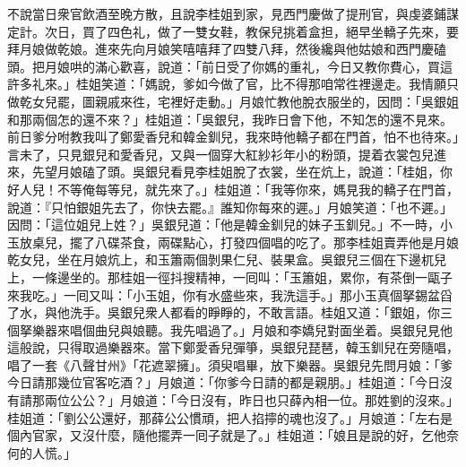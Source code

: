 不說當日衆官飲酒至晚方散，且說李桂姐到家，見西門慶做了提刑官，與虔婆鋪謀定計。次日，買了四色礼，做了一雙女鞋，教保兒挑着盒担，絕早坐轎子先來，要拜月娘做乾娘。進來先向月娘笑嘻嘻拜了四雙八拜，然後纔與他姑娘和西門慶磕頭。{}把月娘哄的滿心歡喜，說道：「前日受了你媽的重礼，今日又教你費心，買這許多礼來。」桂姐笑道：「媽說，爹如今做了官，比不得那咱常徃裡邊走。我情願只做乾女兒罷，圖親戚來徃，宅裡好走動。」月娘忙教他脫衣服坐的，因問：「吳銀姐和那兩個怎的還不來？」桂姐道：「吳銀兒，我昨日會下他，不知怎的還不見來。前日爹分咐教我叫了鄭愛香兒和韓金釧兒，我來時他轎子都在門首，怕不也待來。」言未了，只見銀兒和愛香兒，又與一個穿大紅紗衫年小的粉頭，提着衣裳包兒進來，先望月娘磕了頭。吳銀兒看見李桂姐脫了衣裳，坐在炕上，說道：「桂姐，你好人兒！不等俺每等兒，就先來了。」桂姐道：「我等你來，媽見我的轎子在門首，說道：『只怕銀姐先去了，你快去罷。』誰知你每來的遲。」月娘笑道：「也不遲。」因問：「這位姐兒上姓？」吳銀兒道：「他是韓金釧兒的妹子玉釧兒。」不一時，小玉放桌兒，擺了八碟茶食，兩碟點心，打發四個唱的吃了。那李桂姐賣弄他是月娘乾女兒，坐在月娘炕上，和玉簫兩個剝果仁兒、裝果盒。吳銀兒三個在下邊杌兒上，一條邊坐的。那桂姐一徑抖搜精神，一囘叫：「玉簫姐，累你，有茶倒一甌子來我吃。」一囘又叫：「小玉姐，你有水盛些來，我洗這手。」那小玉真個拏錫盆舀了水，與他洗手。吳銀兒衆人都看的睜睜的，不敢言語。桂姐又道：「銀姐，你三個拏樂器來唱個曲兒與娘聽。我先唱過了。」{}月娘和李嬌兒對面坐着。吳銀兒見他這般說，只得取過樂器來。當下鄭愛香兒彈箏，吳銀兒琵琶，韓玉釧兒在旁隨唱，唱了一套《八聲甘州》「花遮翠擁」。須臾唱畢，放下樂器。吳銀兒先問月娘：「爹今日請那幾位官客吃酒？」月娘道：「你爹今日請的都是親朋。」桂姐道：「今日沒有請那兩位公公？」月娘道：「今日沒有，昨日也只薛內相一位。那姓劉的沒來。」桂姐道：「劉公公還好，那薛公公慣頑，把人掐擰的魂也沒了。」月娘道：「左右是個內官家，又沒什麼，{}隨他擺弄一囘子就是了。」桂姐道：「娘且是說的好，乞他奈何的人慌。」

